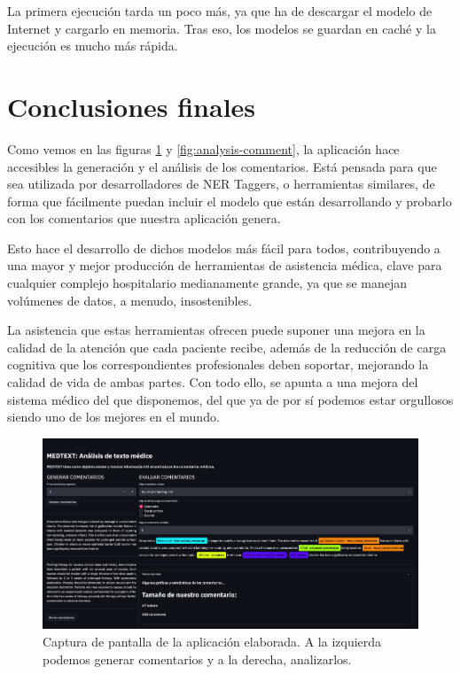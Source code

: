 La primera ejecución tarda un poco más, ya que ha de descargar el modelo de Internet y cargarlo en memoria. Tras eso, los modelos se guardan en caché y la ejecución es mucho más rápida.

\section{Conclusiones finales}

Como vemos en las figuras \ref{fig:app-demo} y \ref{fig:analysis-comment}, la aplicación hace accesibles la generación y el análisis de los comentarios. Está pensada para que sea utilizada por desarrolladores de NER Taggers, o herramientas similares, de forma que fácilmente puedan incluir el modelo que están desarrollando y probarlo con los comentarios que nuestra aplicación genera.

Esto hace el desarrollo de dichos modelos más fácil para todos, contribuyendo a una mayor y mejor producción de herramientas de asistencia médica, clave para cualquier complejo hospitalario medianamente grande, ya que se manejan volúmenes de datos, a menudo, insostenibles.

La asistencia que estas herramientas ofrecen puede suponer una mejora en la calidad de la atención que cada paciente recibe, además de la reducción de carga cognitiva que los correspondientes profesionales deben soportar, mejorando la calidad de vida de ambas partes. Con todo ello, se apunta a una mejora del sistema médico del que disponemos, del que ya de por sí podemos estar orgullosos siendo uno de los mejores en el mundo.

\begin{figure}[h]
	\centering
	\includegraphics[width=.9\textwidth]{media/app_demo.jpeg}
	\caption{Captura de pantalla de la aplicación elaborada. A la izquierda podemos generar comentarios y a la derecha, analizarlos.}
	\label{fig:app-demo}
\end{figure}


